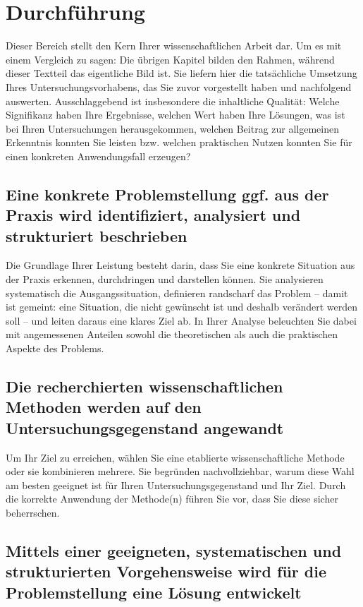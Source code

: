 \chapter{Durchführung}
\label{chap:durchfuehrung}

Dieser Bereich stellt den Kern Ihrer wissenschaftlichen Arbeit dar. Um es mit einem Vergleich zu sagen: Die übrigen Kapitel bilden den Rahmen, während dieser Textteil das eigentliche Bild ist. Sie liefern hier die tatsächliche Umsetzung Ihres Untersuchungsvorhabens, das Sie zuvor vorgestellt haben und nachfolgend auswerten. Ausschlaggebend ist insbesondere die inhaltliche Qualität: Welche Signifikanz haben Ihre Ergebnisse, welchen Wert haben Ihre Lösungen, was ist bei Ihren Untersuchungen herausgekommen, welchen Beitrag zur allgemeinen Erkenntnis konnten Sie leisten bzw. welchen praktischen Nutzen konnten Sie für einen konkreten Anwendungsfall erzeugen?

\section{Eine konkrete Problemstellung ggf. aus der Praxis wird identifiziert, analysiert und strukturiert beschrieben}
\label{sec:problemstellung-beschreibung}

Die Grundlage Ihrer Leistung besteht darin, dass Sie eine konkrete Situation aus der Praxis erkennen, durchdringen und darstellen können. Sie analysieren systematisch die Ausgangssituation, definieren randscharf das Problem – damit ist gemeint: eine Situation, die nicht gewünscht ist und deshalb verändert werden soll – und leiten daraus eine klares Ziel ab. In Ihrer Analyse beleuchten Sie dabei mit angemessenen Anteilen sowohl die theoretischen als auch die praktischen Aspekte des Problems.

\section{Die recherchierten wissenschaftlichen Methoden werden auf den Untersuchungsgegenstand angewandt}
\label{sec:methoden-anwendung}

Um Ihr Ziel zu erreichen, wählen Sie eine etablierte wissenschaftliche Methode oder sie kombinieren mehrere. Sie begründen nachvollziehbar, warum diese Wahl am besten geeignet ist für Ihren Untersuchungsgegenstand und Ihr Ziel. Durch die korrekte Anwendung der Methode(n) führen Sie vor, dass Sie diese sicher beherrschen.

\section{Mittels einer geeigneten, systematischen und strukturierten Vorgehensweise wird für die Problemstellung eine Lösung entwickelt}
\label{sec:loesung-entwicklung}

